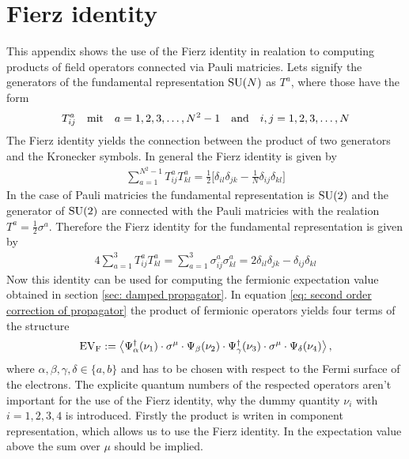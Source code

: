 %
%
\chapter{Fierz identity}
\label{app: Fierz identity}
%
%
This appendix shows the use of the Fierz identity in realation to computing products of field operators connected via Pauli matricies.
Lets signify the generators of the fundamental representation $\mathrm{SU}(N)$ as $T^{a}$, where those have the form
%
\begin{align}
	T_{ij}^{a} \qq{mit} a = 1,2,3,\dots,N^{2}-1 \qq{and} i,j=1,2,3,\dots,N
\end{align}
%
The Fierz identity yields the connection between the product of two generators and the Kronecker symbols.
In general the Fierz identity is given by
%
\begin{align}
	\sum\limits_{a=1}^{N^{2}-1} T_{ij}^{a} T_{kl}^{a} = \frac{1}{2}\Big[\delta_{il} \delta_{jk} - \frac{1}{N} \delta_{ij} \delta_{kl}\Big]
\end{align}
%
In the case of Pauli matricies the fundamental representation is $\mathrm{SU}(2)$ and the generator of $\mathrm{SU}(2)$ are connected with the Pauli matricies with the realation $T^{a} = \frac{1}{2} \sigma^{a}$.
Therefore the Fierz identity for the fundamental representation is given by
%
\begin{align}
	4 \sum\limits_{a=1}^{3} T_{ij}^{a} T_{kl}^{a} = \sum\limits_{a=1}^{3} \sigma_{ij}^{a} \sigma_{kl}^{a} = 2 \delta_{il} \delta_{jk} - \delta_{ij} \delta_{kl}
\end{align}
%
Now this identity can be used for computing the fermionic expectation value obtained in section \ref{sec: damped propagator}.
In equation \eqref{eq: second order correction of propagator} the product of fermionic operators yields four terms of the structure
%
\begin{align}
	\mt{EV}_{\mt{F}} := \expval{\Psi_{\alpha}^{\dag}(\nu_{1}) \cdot \sigma^{\mu} \cdot \Psi_{\beta}(\nu_{2}) \cdot \Psi_{\gamma}^{\dag}(\nu_{3}) \cdot \sigma^{\mu} \cdot \Psi_{\delta}(\nu_{4})},
\end{align}
%
where $\alpha, \beta, \gamma, \delta \in \{a,b\}$ and has to be chosen with respect to the Fermi surface of the electrons.
The explicite quantum numbers of the respected operators aren't important for the use of the Fierz identity, why the dummy quantity $\nu_{i}$ with $i = 1,2,3,4$ is introduced.
Firstly the product is writen in component representation, which allows us to use the Fierz identity.
In the expectation value above the sum over $\mu$ should be implied.
